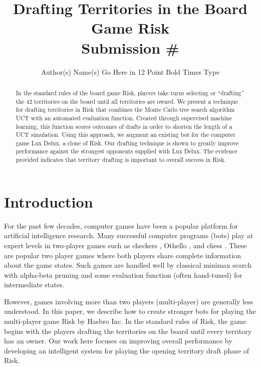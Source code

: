 \documentclass[letterpaper]{article}
\title{Drafting Territories in the Board Game Risk\\ Submission \#}
\author{Author(s) Name(s) Go Here in 12 Point Bold Times Type}
\numberwithin{equation}{section}
\numberwithin{theorem}{section}
\numberwithin{lemma}{section}
\numberwithin{df}{section}
\begin{document}
\maketitle

\begin{abstract}
In the standard rules of the board game Risk, players take turns selecting or ``drafting'' the 42 territories on the board until all territories are owned.  We present a technique for drafting territories in Risk that combines the Monte Carlo tree search algorithm UCT with an automated evaluation function.  Created through supervised machine learning, this function scores outcomes of drafts in order to shorten the length of a UCT simulation.  Using this approach, we augment an existing bot for the computer game Lux Delux, a clone of Risk.  Our drafting technique is shown to greatly improve performance against the strongest opponents supplied with Lux Delux.  The evidence provided indicates that territory drafting is important to overall success in Risk.
\end{abstract}

\section{Introduction}


For the past few decades, computer games have been a popular platform for artificial intelligence research.  Many successful computer programs (bots) play at expert levels in two-player games such as checkers \cite{Chinook}, Othello \cite{Othello}, and
chess \cite{DeepBlue}.  These are popular two player games where both players share complete information about the game states.  Such games are handled well by classical minimax search with alpha-beta pruning and some evaluation function (often hand-tuned) for intermediate states.  

However, games involving more than two players (multi-player) are generally less understood.  In this paper, we describe how to create stronger bots for playing the multi-player game Risk by Hasbro Inc.  In the standard rules of Risk, the game begins with the players drafting the territories on the board until every territory has an owner.  Our work here focuses on improving overall performance by developing an intelligent system for playing the opening territory draft phase of Risk.
\end{document}
